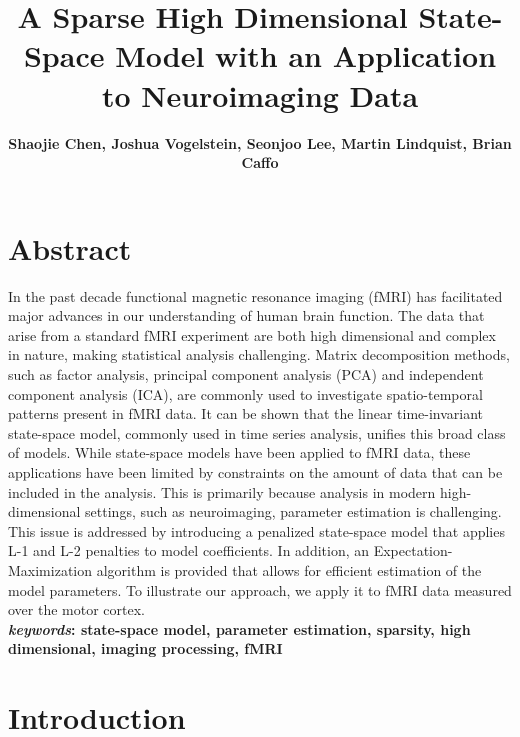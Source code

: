 \documentclass[fleqn]{article}
\begin{document}
\title{A Sparse High Dimensional State-Space Model with an Application to Neuroimaging Data}
\author{\bf{Shaojie Chen, Joshua Vogelstein, Seonjoo Lee, Martin Lindquist, Brian Caffo}}
\maketitle
\section*{Abstract}
In the past decade functional magnetic resonance imaging (fMRI) has facilitated major advances in our understanding of human brain function. The data that arise from a standard fMRI experiment are both high dimensional and complex in nature, making statistical analysis challenging. Matrix decomposition methods, such as factor analysis, principal component analysis (PCA) and independent component analysis (ICA), are commonly used to investigate spatio-temporal patterns present in fMRI data. It can be shown that the linear time-invariant state-space model, commonly used in time series analysis, unifies this broad class of models. While state-space models have been applied to fMRI data, these applications have been limited by constraints on the amount of data that can be included in the analysis. This is primarily because analysis in modern high-dimensional settings, such as neuroimaging, parameter estimation is challenging. This issue is addressed by introducing a penalized state-space model that applies L-1 and L-2 penalties to model coefficients. In addition, an Expectation-Maximization algorithm is provided that allows for efficient estimation of the model parameters. To illustrate our approach, we apply it to fMRI data measured over the motor cortex.\\

\textbf{\emph{keywords}: state-space model, parameter estimation, sparsity, high dimensional, imaging processing, fMRI}
\newpage
\section{Introduction}
\end{document}

